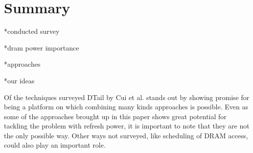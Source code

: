 \section{Summary} 
\label{sec:sum}
*conducted survey

*dram power importance

*approaches

*our ideas

Of the techniques surveyed DTail by Cui et al. stands out by showing promise for being a platform on which combining many kinds approaches is possible. Even as some of the approaches brought up in this paper shows great potential for tackling the problem with refresh power, it is important to note that they are not the only possible way. Other ways not surveyed, like scheduling of DRAM access, could also play an important role.   

